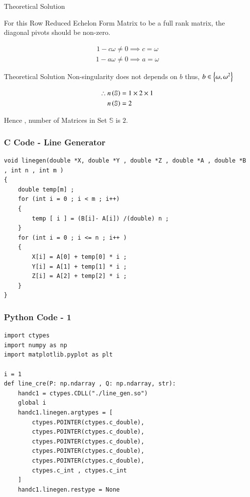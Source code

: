 \documentclass{beamer}
\begin{document}
\begin{frame}{Theoretical Solution}

For this Row Reduced Echelon Form Matrix to be a full rank matrix, 
the diagonal pivots should be non-zero.

\begin{align}
    1-c\omega \neq 0 \implies c = \omega
\end{align}
\begin{align}
    1-a\omega \neq 0 \implies a = \omega
\end{align}
\end{frame}
\begin{frame}{Theoretical Solution}
Non-singularity does not depends on $b$ thus, $b \in \left\{\omega , \omega^2\right\} $

\begin{align}
    \therefore n\left(\mathbb{S}\right) &= 1 \times 2 \times 1 \\
               n\left(\mathbb{S}\right) &= 2
\end{align}

Hence , number of Matrices in Set $\mathbb{S}$ is $2$.

\end{frame}

\begin{frame}[fragile]
    \frametitle{C Code - Line Generator  }
    \begin{lstlisting}
void linegen(double *X, double *Y , double *Z , double *A , double *B , int n , int m )
{
    double temp[m] ; 
    for (int i = 0 ; i < m ; i++)
    {
        temp [ i ] = (B[i]- A[i]) /(double) n ; 
    }
    for (int i = 0 ; i <= n ; i++ )
    {
        X[i] = A[0] + temp[0] * i ; 
        Y[i] = A[1] + temp[1] * i ;
        Z[i] = A[2] + temp[2] * i ; 
    }
}
\end{lstlisting}
\end{frame}

\begin{frame}[fragile]
    \frametitle{Python Code - 1 }
    \begin{lstlisting}
import ctypes
import numpy as np
import matplotlib.pyplot as plt

i = 1 
def line_cre(P: np.ndarray , Q: np.ndarray, str):
    handc1 = ctypes.CDLL("./line_gen.so")
    global i 
    handc1.linegen.argtypes = [
        ctypes.POINTER(ctypes.c_double),
        ctypes.POINTER(ctypes.c_double),
        ctypes.POINTER(ctypes.c_double),
        ctypes.POINTER(ctypes.c_double),
        ctypes.POINTER(ctypes.c_double),
        ctypes.c_int , ctypes.c_int
    ]
    handc1.linegen.restype = None

\end{lstlisting}
\end{frame}
\end{document}
